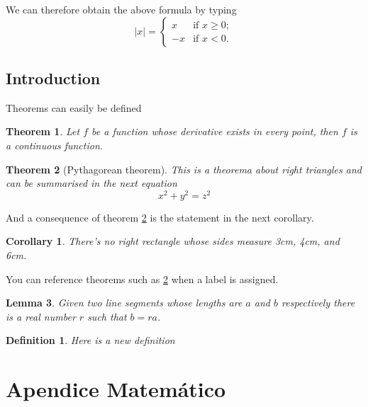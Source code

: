             
        We can therefore obtain the above formula by typing
        \[ |x| = \left\{ \begin{array}{ll}
                 x & \mbox{if $x \geq 0$};\\
                -x & \mbox{if $x < 0$}.\end{array} \right. \]


\newtheorem{theorem}{Theorem}[section]
\newtheorem{corollary}{Corollary}[theorem]
\newtheorem{lemma}[theorem]{Lemma}
 

\section{Introduction}
Theorems can easily be defined
 
\begin{theorem}
Let $f$ be a function whose derivative exists in every point, then $f$ is 
a continuous function.
\end{theorem}
 
\begin{theorem}[Pythagorean theorem]
\label{pythagorean}
This is a theorema about right triangles and can be summarised in the next 
equation 
\[ x^2 + y^2 = z^2 \]
\end{theorem}
 
And a consequence of theorem \ref{pythagorean} is the statement in the next 
corollary.
 
\begin{corollary}
There's no right rectangle whose sides measure 3cm, 4cm, and 6cm.
\end{corollary}
 
You can reference theorems such as \ref{pythagorean} when a label is assigned.
 
\begin{lemma}
Given two line segments whose lengths are $a$ and $b$ respectively there is a 
real number $r$ such that $b=ra$.
\end{lemma}


\newtheorem{mydef}{Definition}
\begin{mydef}
Here is a new definition
\end{mydef}


\chapter{Apendice Matemático}
